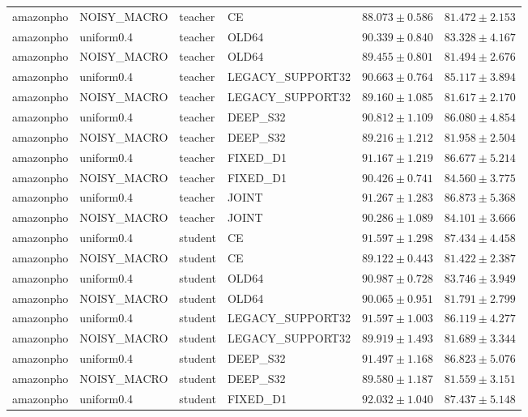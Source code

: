 \begin{longtable}{llllrr}
amazonpho & NOISY\_MACRO & teacher & CE & $88.073 \pm 0.586$ & $81.472 \pm 2.153$ \\
amazonpho & uniform0.4 & teacher & OLD64 & $90.339 \pm 0.840$ & $83.328 \pm 4.167$ \\
amazonpho & NOISY\_MACRO & teacher & OLD64 & $89.455 \pm 0.801$ & $81.494 \pm 2.676$ \\
amazonpho & uniform0.4 & teacher & LEGACY\_SUPPORT32 & $90.663 \pm 0.764$ & $85.117 \pm 3.894$ \\
amazonpho & NOISY\_MACRO & teacher & LEGACY\_SUPPORT32 & $89.160 \pm 1.085$ & $81.617 \pm 2.170$ \\
amazonpho & uniform0.4 & teacher & DEEP\_S32 & $90.812 \pm 1.109$ & $86.080 \pm 4.854$ \\
amazonpho & NOISY\_MACRO & teacher & DEEP\_S32 & $89.216 \pm 1.212$ & $81.958 \pm 2.504$ \\
amazonpho & uniform0.4 & teacher & FIXED\_D1 & $91.167 \pm 1.219$ & $86.677 \pm 5.214$ \\
amazonpho & NOISY\_MACRO & teacher & FIXED\_D1 & $90.426 \pm 0.741$ & $84.560 \pm 3.775$ \\
amazonpho & uniform0.4 & teacher & JOINT & $91.267 \pm 1.283$ & $86.873 \pm 5.368$ \\
amazonpho & NOISY\_MACRO & teacher & JOINT & $90.286 \pm 1.089$ & $84.101 \pm 3.666$ \\
amazonpho & uniform0.4 & student & CE & $91.597 \pm 1.298$ & $87.434 \pm 4.458$ \\
amazonpho & NOISY\_MACRO & student & CE & $89.122 \pm 0.443$ & $81.422 \pm 2.387$ \\
amazonpho & uniform0.4 & student & OLD64 & $90.987 \pm 0.728$ & $83.746 \pm 3.949$ \\
amazonpho & NOISY\_MACRO & student & OLD64 & $90.065 \pm 0.951$ & $81.791 \pm 2.799$ \\
amazonpho & uniform0.4 & student & LEGACY\_SUPPORT32 & $91.597 \pm 1.003$ & $86.119 \pm 4.277$ \\
amazonpho & NOISY\_MACRO & student & LEGACY\_SUPPORT32 & $89.919 \pm 1.493$ & $81.689 \pm 3.344$ \\
amazonpho & uniform0.4 & student & DEEP\_S32 & $91.497 \pm 1.168$ & $86.823 \pm 5.076$ \\
amazonpho & NOISY\_MACRO & student & DEEP\_S32 & $89.580 \pm 1.187$ & $81.559 \pm 3.151$ \\
amazonpho & uniform0.4 & student & FIXED\_D1 & $92.032 \pm 1.040$ & $87.437 \pm 5.148$ \\

\end{longtable}
